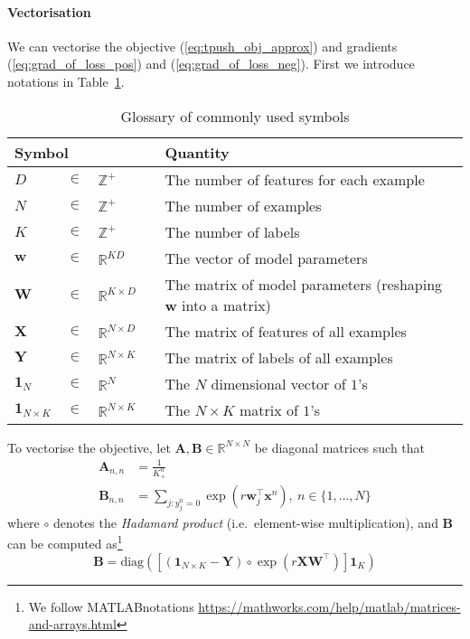\documentclass[9pt]{extarticle}
\newcommand{\x}{\mathbf{x}}
\newcommand{\1}{\mathbf{1}}
\newcommand{\w}{\mathbf{w}}
\newcommand{\A}{\mathbf{A}}
\newcommand{\B}{\mathbf{B}}
\newcommand{\W}{\mathbf{W}}
\newcommand{\X}{\mathbf{X}}
\newcommand{\Y}{\mathbf{Y}}
\newcommand{\R}{\mathbb{R}}
\newcommand{\Z}{\mathbb{Z}}
\newcommand{\one}{\mathbf{1}}
\newcommand{\ie}{i.e.\ }
\newcommand{\diag}{\text{diag}}
\begin{document}
\paragraph{Vectorisation}
We can vectorise the objective (\ref{eq:tpush_obj_approx}) and gradients (\ref{eq:grad_of_loss_pos}) and (\ref{eq:grad_of_loss_neg}).
First we introduce notations in Table~\ref{tab:symbol_tpush}.
\begin{table}[!h]
\caption{Glossary of commonly used symbols}
\label{tab:symbol_tpush}
\renewcommand{\arraystretch}{1.5} %
\setlength{\tabcolsep}{1pt} %
\centering
\begin{tabular}{llll}
\hline \hline
\multicolumn{3}{l}{\textbf{Symbol}} & \textbf{Quantity} \\ \hline 
$D$        &  $\in$  &  $\Z^+$            & The number of features for each example \\
$N$        &  $\in$  &  $\Z^+$            & The number of examples \\
$K$        &  $\in$  &  $\Z^+$            & The number of labels \\
$\w$       &  $\in$  &  $\R^{K D}$        & The vector of model parameters \\
$\W$       &  $\in$  &  $\R^{K \times D}$ & The matrix of model parameters (reshaping $\w$ into a matrix) \\
$\X$       &  $\in$  &  $\R^{N \times D}$ & The matrix of features of all examples \\
$\Y$       &  $\in$  &  $\R^{N \times K}$ & The matrix of labels of all examples \\
$\one_N$   &  $\in$  &  $\R^N$            & The $N$ dimensional vector of $1$'s \\
$\one_{N \times K}$  &  $\in$  &  $\R^{N \times K} \quad$  & The $N \times K$ matrix of $1$'s \\ \hline
\end{tabular}
\end{table}

To vectorise the objective, 
let $\A, \B \in \R^{N \times N}$ be diagonal matrices such that 
\begin{align*}
\A_{n,n} &= \frac{1}{K_+^n} \\
\B_{n,n} &= \underset{j:y_j^n=0}{\sum} \exp\left( r \w_j^\top \x^n \right), \ n \in \{1,\dots,N\}
\end{align*}
where $\circ$ denotes the \emph{Hadamard product} (\ie element-wise multiplication), and
$\B$ can be computed as\footnote{We follow MATLAB\textsuperscript{\textregistered}notations \url{https://mathworks.com/help/matlab/matrices-and-arrays.html}}
$$
\B = \diag \left( \left[ \left( \one_{N \times K} - \Y \right) \circ \exp \left( r \X \W^\top \right) \right] \one_K \right)
$$
\end{document}
